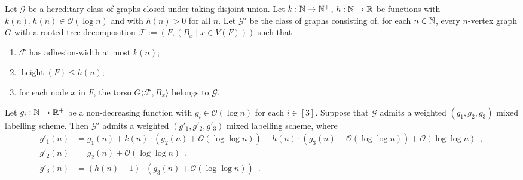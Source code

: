 \documentclass{patmorin}
\renewcommand{\le}{\leqslant}
\newcommand{\torso}[2]{{#1}\langle{#2}\rangle}
\DeclareMathOperator{\height}{height}
\newcommand{\Oh}{\mathcal{O}}
\begin{document}
  \begin{lem}\label{small_height}
    Let $\mathcal{G}$ be a hereditary class of graphs closed under taking disjoint union. Let $k:\mathbb{N}\to\mathbb{N}^+$,  $h:\mathbb{N}\to\mathbb{R}$ be functions with $k(n),h(n)\in \Oh(\log n)$ and with $h(n)>0$ for all $n$.   Let $\mathcal{G'}$ be the class of graphs consisting of, for each $n\in\mathbb{N}$, every $n$-vertex graph $G$ with a rooted tree-decomposition $\mathcal{F}:=(F,(B_x \mid x\in V(F)))$ such that
    \begin{enumerate}[nosep,nolistsep,label=(\rm{\roman*)}]
      \item $\mathcal{F}$ has adhesion-width at most $k(n)$;
      \item $\height(F)\le h(n)$;
      \item for each node $x$ in $F$, the torso $\torso{G}{\mathcal{F},B_x}$ belongs to $\mathcal{G}$.
    \end{enumerate}
    Let $g_i:\mathbb{N}\to\mathbb{R}^+$ be a non-decreasing function  with $g_i\in\Oh(\log n)$ for each $i\in[3]$. Suppose that $\mathcal{G}$ admits a weighted $(g_1,g_2,g_3)$ mixed labelling scheme. Then $\mathcal{G}'$ admits a weighted $(g'_1,g'_2,g'_3)$ mixed labelling scheme, where
    \begin{align*}
       g'_1(n) & = g_1(n)
             + k(n)\cdot (g_2(n)+\Oh(\log\log n))
            + h(n)\cdot (g_3(n)+\Oh(\log\log n)) +\Oh(\log\log n)\enspace,\\
       g'_2(n) & = g_2(n) + \Oh(\log\log n)\enspace, \\
       g'_3(n) & = (h(n)+1)\cdot (g_3(n)+\Oh(\log\log n))\enspace.
    \end{align*}
  \end{lem}
\end{document}
